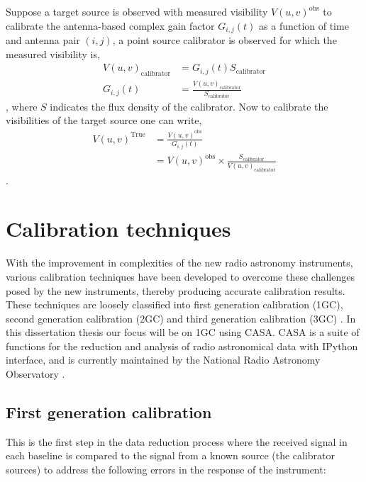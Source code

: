 Suppose a target source is observed with measured visibility $V(u,v)^{\mathrm{obs}}$ to calibrate the antenna-based complex gain factor $G_{i,j}(t)$ as a function of time and antenna pair $(i,j)$, a point source calibrator is observed for which the measured visibility is, 
\begin{align} 
V(u,v)_{\mathrm{calibrator}}&= G_{i,j}(t) S_{\mathrm{calibrator}}\\
G_{i,j}(t)&= \frac{V(u,v)_{\mathrm{calibrator}}}{S_{\mathrm{calibrator}}}
\end{align}
\citep{thompson2001interferometry},
where $S$ indicates the flux density of the calibrator. Now to calibrate the visibilities of the target source one can write, 
\begin{align}
V(u,v)^{\mathrm{True}}&= \frac{V(u,v)^{\mathrm{obs}}}{G_{i,j}(t)}\\
&= V(u,v)^{\mathrm{obs}} \times \frac{S_{\mathrm{calibrator}}}{V(u,v)_{\mathrm{calibrator}}} 
\end{align}
\citep{thompson2001interferometry}. 

\section{Calibration techniques}
\label{caltech}
With the improvement in complexities of the new radio astronomy instruments, various calibration techniques have been developed to overcome these challenges  posed by the new instruments, thereby producing accurate calibration results. These techniques are loosely classified into first generation calibration (1GC), second generation calibration (2GC) and third generation calibration (3GC) \citep{noordam2010meqtrees}. In this dissertation thesis our focus will be on 1GC using CASA. CASA is a suite of functions for the reduction and analysis of radio astronomical data with IPython interface, and is currently maintained by the National Radio Astronomy Observatory \citep{mcmullin2007casa}. 

\subsection{First generation calibration}

This is the first step in the data reduction process where the received signal in each baseline is compared to the signal from a known source (the calibrator sources) to address the following errors in the response of the instrument: 

